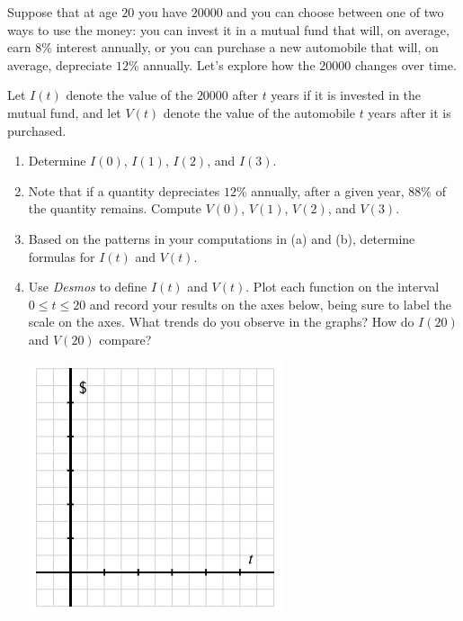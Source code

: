 \documentclass[nooutcomes]{ximera}
\begin{document}
\begin{exploration}
Suppose that at age \(20\) you have \textdollar{}\(20000\) and you can choose between one of two ways to use the money:  you can invest it in a mutual fund that will, on average, earn \(8\)\% interest annually, or you can purchase a new automobile that will, on average, depreciate \(12\)\% annually.  Let's explore how the \(20000\) changes over time.%

Let \(I(t)\) denote the value of the \textdollar{}\(20000\) after \(t\) years if it is invested in the mutual fund, and let \(V(t)\) denote the value of the automobile \(t\) years after it is purchased.

\begin{enumerate}[label=\alph*.]
\item Determine \(I(0)\), \(I(1)\), \(I(2)\), and \(I(3)\).
\item Note that if a quantity depreciates \(12\)\% annually, after a given year, \(88\)\% of the quantity remains.  Compute \(V(0)\), \(V(1)\), \(V(2)\), and \(V(3)\).
\item Based on the patterns in your computations in (a) and (b), determine formulas for \(I(t)\) and \(V(t)\).
\item Use \emph{Desmos} to define \(I(t)\) and \(V(t)\).  Plot each function on the interval \(0 \le t \le 20\) and record your results on the axes below, being sure to label the scale on the axes.  What trends do you observe in the graphs?  How do \(I(20)\) and \(V(20)\) compare?
\begin{image}
\includegraphics{ExpText1.jpg}
\end{image}
\end{enumerate}
\end{exploration}


\end{document}
